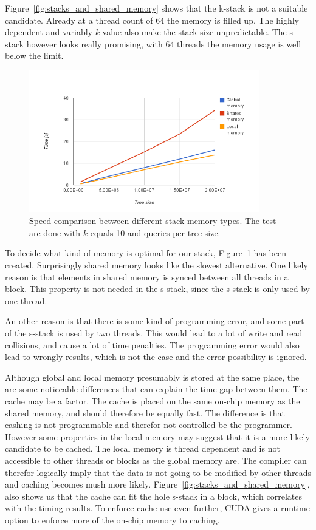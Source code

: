 Figure~\ref{fig:stacks_and_shared_memory} shows that the k-stack is not a suitable candidate. Already at a thread count of $64$ the memory is filled up. The highly dependent and variably $k$ value also make the stack size unpredictable. The s-stack however looks really promising, with $64$ threads the memory usage is well below the limit.

\begin{figure}[ht!]
    \centering
    \includegraphics[width=100mm]{../gfx/stack_speed.png}

    \caption{Speed comparison between different stack memory types. The test are done with $k$ equals 10 and  queries per tree size. }
    \label{tbl:stack_speed}
\end{figure}



To decide what kind of memory is optimal for our stack, Figure~\ref{tbl:stack_speed} has been created. Surprisingly shared memory looks like the slowest alternative. One likely reason is that elements in shared memory is synced between all threads in a block. This property is not needed in the s-stack, since the s-stack is only used by one thread. 


An other reason is that there is some kind of programming error, and some part of the s-stack is used by two threads. This would lead to a lot of write and read collisions, and cause a lot of time penalties. The programming error would also lead to wrongly results, which is not the case and the error possibility is ignored.

Although global and local memory presumably is stored at the same place, the are some noticeable differences that can explain the time gap between them. The cache may be a factor. The cache is placed on the same on-chip memory as the shared memory, and should therefore be equally fast. The difference is that cashing is not programmable and therefor not controlled be the programmer. However some properties in the local memory may suggest that it is a more likely candidate to be cached. The local memory is thread dependent and is not accessible to other threads or blocks as the global memory are. The compiler can therefor logically imply that the data is not going to be modified by other threads and caching becomes mush more likely. Figure~\ref{fig:stacks_and_shared_memory}, also shows us that the cache can fit the hole s-stack in a block, which correlates with the timing results. To enforce cache use even further, CUDA gives a runtime option to enforce more of the on-chip memory to caching.


